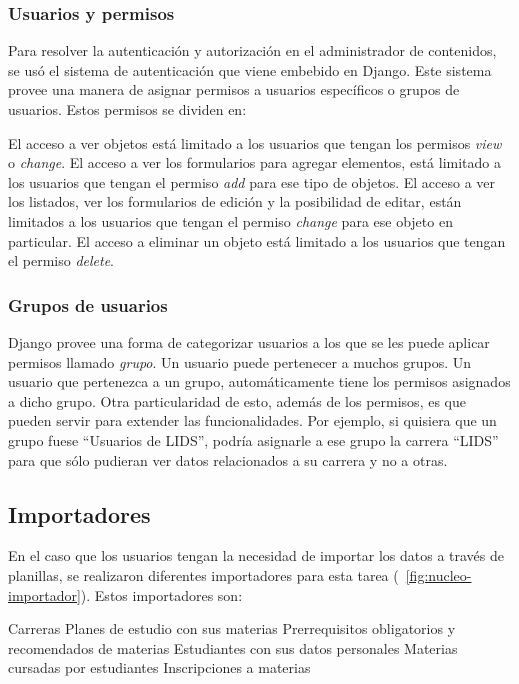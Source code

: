 \subsubsection{Usuarios y permisos}

Para resolver la autenticación y autorización en el administrador de contenidos, se usó el sistema de autenticación que viene embebido en Django.
Este sistema provee una manera de asignar permisos a usuarios específicos o grupos de usuarios. Estos permisos se dividen en:
\begin{outline}
    \1 El acceso a ver objetos está limitado a los usuarios que tengan los permisos \textit{view} o \textit{change}.
    \1 El acceso a ver los formularios para agregar elementos, está limitado a los usuarios que tengan el permiso \textit{add} para ese tipo de objetos.
    \1 El acceso a ver los listados, ver los formularios de edición y la posibilidad de editar, están limitados a los usuarios que tengan el permiso \textit{change} para ese objeto en particular.
    \1 El acceso a eliminar un objeto está limitado a los usuarios que tengan el permiso \textit{delete}.
\end{outline}

\subsubsection{Grupos de usuarios}

Django provee una forma de categorizar usuarios a los que se les puede aplicar permisos llamado \textit{grupo}. Un usuario puede pertenecer a muchos grupos.
Un usuario que pertenezca a un grupo, automáticamente tiene los permisos asignados a dicho grupo.
Otra particularidad de esto, además de los permisos, es que pueden servir para extender las funcionalidades. Por ejemplo, si quisiera que un grupo fuese “Usuarios de LIDS”, podría asignarle a ese grupo la carrera “LIDS” para que sólo pudieran ver datos relacionados a su carrera y no a otras.


\subsection{Importadores}

En el caso que los usuarios tengan la necesidad de importar los datos a través de planillas, se realizaron diferentes importadores para esta tarea (~\ref{fig:nucleo-importador}).
Estos importadores son:
\begin{outline}
\2 Carreras
\2 Planes de estudio con sus materias
\2 Prerrequisitos obligatorios y recomendados de materias
\2 Estudiantes con sus datos personales
\2 Materias cursadas por estudiantes
\2 Inscripciones a materias
\end{outline}


